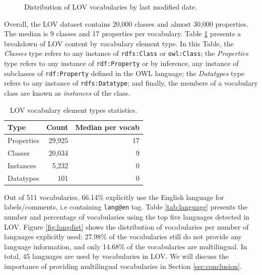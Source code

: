 \documentclass{iosart2c}
\begin{document}
\begin{figure}[htb]
\resizebox{\linewidth}{!}{}
\caption{\label{fig:modifevol} Distribution of LOV vocabularies by last modified date.}
\end{figure}

 
Overall, the LOV dataset contains 20,000 classes and almost 30,000 properties. The median is 9 classes and 17 properties per vocabulary. Table \ref{tab:elements} presents a breakdown of LOV content by vocabulary element type. In this Table, the  \emph{Classes} type refers to any instance of {\small\texttt{rdfs:Class}} or {\small\texttt{owl:Class}}; the  \emph{Properties} type refers to any instance of {\small\texttt{rdf:Property}} or by inference, any instance of subclasses of {\small\texttt{rdf:Property}} defined in the OWL language; the \emph{Datatypes} type refers to any instance of {\small\texttt{rdfs:Datatype}}; and finally, the members of a vocabulary class are known as \emph{instances} of the class.

\begin{table}[htb]
\caption{LOV vocabulary element types statistics.}
\begin{tabular}{lrr}
\hline
\textbf{Type} & \textbf{Count} &  \textbf{Median per vocab} \\ \hline
Properties & 29,925 & 17 \\
Classes & 20,034 & 9 \\
Instances & 5,232 & 0 \\
Datatypes & 101 & 0 \\
\hline  
\end{tabular}
\label{tab:elements}
\end{table}

Out of 511 vocabularies, 66.14\% explicitly use the English language for labels/comments, i.e containing \texttt{lang@en} tag. Table \ref{tab:language} presents the number and percentage of vocabularies using the top five languages detected in LOV. Figure \ref{fig:langdist} shows the distribution of vocabularies per number of languages explicitly 
used: 27.98\% of the vocabularies still do not provide any language information, and only 14.68\% of the vocabularies are multilingual. In total, 45 languages are used by vocabularies in LOV. We will discuss the importance of providing multilingual vocabularies in Section \ref{sec:conclusion}.
\end{document}
